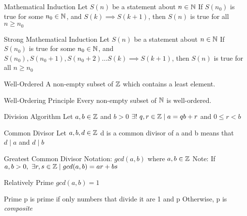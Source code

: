 \begin{flashcard}[Definition]{Mathematical Induction}
  Let $S(n)$ be a statement about $n \in \mathbb{N}$
  \vfill
  If $S(n_0)$ is true for some $n_0 \in \mathbb{N}$, and $S(k) \implies S(k+1)$, then $S(n)$ is true for all $n \geq n_0$
\end{flashcard}

\begin{flashcard}[Definition]{Strong Mathematical Induction}
  Let $S(n)$ be a statement about $n \in \mathbb{N}$
  \vfill
  If $S(n_0)$ is true for some $n_0 \in \mathbb{N}$, and $S(n_0), S(n_0 + 1), S(n_0+2) \dots S(k) \implies S(k+1)$, then $S(n)$ is true for all $n \geq n_0$
\end{flashcard}

\begin{flashcard}[Definition]{Well-Ordered}
  A non-empty subset of $\mathbb{Z}$ which contains a least element.
\end{flashcard}

\begin{flashcard}[Definition]{Well-Ordering Principle}
  Every non-empty subset of $\mathbb{N}$ is well-ordered.
\end{flashcard}

\begin{flashcard}[Definition]{Division Algorithm}
  Let $a,b \in \mathbb{Z}$ and $b > 0$
  \vfill
  $\exists!\ q,r \in \mathbb{Z} \mid a = qb + r$ and $0 \leq r < b$
\end{flashcard}

\begin{flashcard}[Definition]{Common Divisor}
  Let $a,b,d \in \mathbb{Z}$
  \vfill
  d is a common divisor of a and b means that $d \mid a$ and $d \mid b$
\end{flashcard}

\begin{flashcard}[Definition]{Greatest Common Divisor}
  Notation: $gcd(a,b)$ where $a,b \in \mathbb{Z}$
  \vfill
  Note: If $a,b > 0,\ \exists r,s \in \mathbb{Z} \mid gcd(a,b) = ar + bs$
\end{flashcard}

\begin{flashcard}[Definition]{Relatively Prime}
  $gcd(a,b) = 1$
\end{flashcard}

\begin{flashcard}[Definition]{Prime}
  p is prime if only numbers that divide it are 1 and p
  \vfill
  Otherwise, p is \emph{composite}
\end{flashcard}

